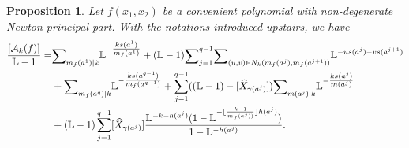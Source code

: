 \documentclass[12pt,a4paper,leqno]{amsart}
\newtheorem{prop}[thm]{Proposition}
\theoremstyle{definition}
\begin{document}
\begin{prop}\label{prop-2} Let $f(x_1,x_2)$ be a convenient polynomial with
  non-degenerate Newton principal part. With the notations introduced
  upstairs, we have
\begin{align*}
\frac{[\mathcal A_k(f)]}{{\mathbb{L}}-1}
=&
{\mathop{\textrm{\scriptsize $\mathop\sum$}}}_{m_f(a^1)|k} {\mathbb{L}}^{-\tfrac{ks(a^1)}{m_f(a^1)}}
+({\mathbb{L}}-1){\mathop{\textrm{\scriptsize $\mathop\sum$}}}_{j=1}^{q-1}
{\mathop{\textrm{\scriptsize $\mathop\sum$}}}_{(u,v)\in N_k(m_f(a^j),m_f(a^{j+1}))}{\mathbb{L}}^{-us(a^j)-vs(a^{j+1})}\\
&+{\mathop{\textrm{\scriptsize $\mathop\sum$}}}_{m_f(a^q)|k} {\mathbb{L}}^{-\tfrac{ks(a^{q-1})}{m_f(a^{q-1})}}
+\sum_{j=1}^{q-1}(({\mathbb{L}}-1)-[\widehat{X}_{\gamma(a^j)}])
{\mathop{\textrm{\scriptsize $\mathop\sum$}}}_{m(a^j)|k}{\mathbb{L}}^{-\tfrac{ks(a^j)}{m(a^j)}}\\
&+({\mathbb{L}}-1)\sum_{j=1}^{q-1}[\widehat{X}_{\gamma(a^j)}]
\frac{{\mathbb{L}}^{-k-h(a^j)}(1-{\mathbb{L}}^{-\lfloor\frac{k-1}{m_f(a^j))}\rfloor h(a^j)})}
{1-{\mathbb{L}}^{-h(a^j)}}. 
\end{align*}
\end{prop}
\end{document}
